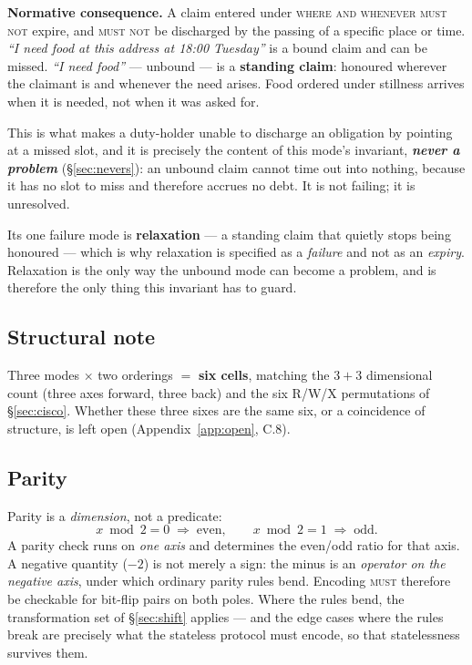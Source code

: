 \documentclass[11pt,a4paper]{article}
\newcommand{\MUST}{\textsc{must}}
\newcommand{\MUSTNOT}{\textsc{must not}}
\begin{document}
\begin{ruleblock}
\textbf{Normative consequence.} A claim entered under \textsc{where and
whenever} \MUSTNOT{} expire, and \MUSTNOT{} be discharged by the passing of a
specific place or time. \emph{``I need food at this address at 18:00 Tuesday''}
is a bound claim and can be missed. \emph{``I need food''} --- unbound --- is a
\textbf{standing claim}: honoured wherever the claimant is and whenever the need
arises. Food ordered under stillness arrives when it is needed, not when it was
asked for.
\end{ruleblock}

This is what makes a duty-holder unable to discharge an obligation by pointing
at a missed slot, and it is precisely the content of this mode's invariant,
\emph{\textbf{never a problem}} (\S\ref{sec:nevers}): an unbound claim cannot
time out into nothing, because it has no slot to miss and therefore accrues no
debt. It is not failing; it is unresolved.

Its one failure mode is \textbf{relaxation} --- a standing claim that quietly
stops being honoured --- which is why relaxation is specified as a \emph{failure}
and not as an \emph{expiry}. Relaxation is the only way the unbound mode can
become a problem, and is therefore the only thing this invariant has to guard.

\subsection{Structural note}

Three modes $\times$ two orderings $=$ \textbf{six cells}, matching the $3+3$
dimensional count (three axes forward, three back) and the six R/W/X
permutations of \S\ref{sec:cisco}. Whether these three sixes are the same six,
or a coincidence of structure, is left open
(Appendix~\ref{app:open}, C.8).

\subsection{Parity}
\label{sec:parity}

Parity is a \emph{dimension}, not a predicate:
\[
x \bmod 2 = 0 \;\Rightarrow\; \text{even}, \qquad
x \bmod 2 = 1 \;\Rightarrow\; \text{odd}.
\]
A parity check runs on \emph{one axis} and determines the even/odd ratio for
that axis. A negative quantity ($-2$) is not merely a sign: the minus is an
\emph{operator on the negative axis}, under which ordinary parity rules bend.
Encoding \MUST{} therefore be checkable for bit-flip pairs on both poles. Where
the rules bend, the transformation set of \S\ref{sec:shift} applies --- and the
edge cases where the rules break are precisely what the stateless protocol must
encode, so that statelessness survives them.
\end{document}
